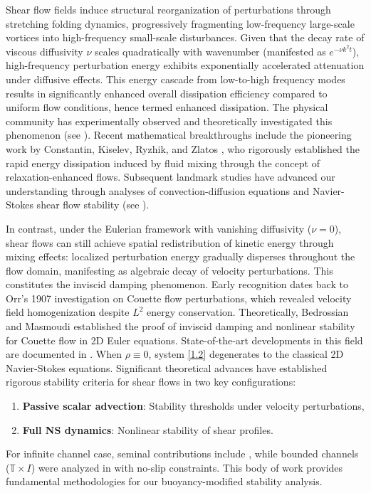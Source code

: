 \documentclass[final, 12pt,reqno]{amsart}
\numberwithin{equation}{section}
\begin{document}
Shear flow fields induce structural reorganization of perturbations
through stretching folding dynamics, progressively fragmenting
low-frequency large-scale vortices into high-frequency small-scale
disturbances. Given that the decay rate of viscous diffusivity $\nu$
scales quadratically with wavenumber (manifested as $e^{-\nu k^2
t}$), high-frequency perturbation energy exhibits exponentially
accelerated attenuation under diffusive effects. This energy cascade
from low-to-high frequency modes results in significantly enhanced
overall dissipation efficiency compared to uniform flow conditions,
hence termed enhanced dissipation. The physical community has
experimentally observed and theoretically investigated this
phenomenon (see \cite{Yaglom.2012}). Recent mathematical
breakthroughs include the pioneering work by Constantin, Kiselev,
Ryzhik, and Zlatos \cite{Constantin2008}, who rigorously established
the rapid energy dissipation induced by fluid mixing through the
concept of relaxation-enhanced flows. Subsequent landmark studies
have advanced our understanding through analyses of
convection-diffusion equations and Navier-Stokes shear flow
stability (see
\cite{Bedrossian.201704,Bedrossian.2017,Bedrossian.2019,Bedrossian.2020,Bedrossian.2016,Bedrossian.2018,Masmoudi.2020,Wei.2023,Wei.2020}).

In contrast, under the Eulerian framework with vanishing diffusivity ($\nu=0$), shear flows can still achieve spatial redistribution of kinetic energy through mixing effects: localized perturbation energy gradually disperses throughout the flow domain, manifesting as algebraic decay of velocity perturbations. This constitutes the inviscid damping phenomenon. Early recognition dates back to Orr's 1907 investigation \cite{Orr.w1907.} on Couette flow perturbations, which revealed velocity field homogenization despite $L^2$ energy conservation. Theoretically, Bedrossian and Masmoudi \cite{Bedrossian2015} established  the proof of inviscid damping and nonlinear stability for Couette flow in 2D Euler equations. State-of-the-art developments in this field are documented in \cite{Ionescu2020,Ionescu.2023,Masmoudi2024}. When $\rho \equiv 0$, system \eqref{1.2} degenerates to the classical 2D Navier-Stokes equations. Significant theoretical advances have established rigorous stability criteria for shear flows in two key configurations:
\begin{enumerate}
    \item \textbf{Passive scalar advection}: Stability thresholds under velocity perturbations,
    \item \textbf{Full NS dynamics}: Nonlinear stability of shear profiles.
\end{enumerate}
For  infinite channel case, seminal contributions include \cite{Bedrossian.2016,Bedrossian.2017,Bedrossian.2018,Bedrossian.2020,Masmoudi.2020,Masmoudi.2022,Wei.2021,Wei.2023}, while bounded channels ($\mathbb{T}\times I$) were analyzed in \cite{Chen.2020,Chen.2024} with no-slip constraints. This body of work provides fundamental methodologies for our buoyancy-modified stability analysis.
\end{document}
